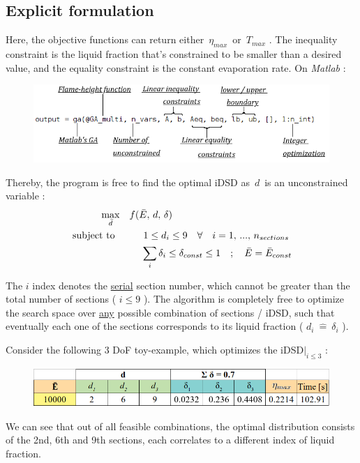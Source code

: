 \documentclass[12pt]{article}
\numberwithin{equation}{section}
\begin{document}
\begin{flushleft}
\subsection{Explicit formulation}
Here, the objective functions can return either \,$\eta_{max}$\, or \,$T_{max}$ . The inequality constraint is the liquid fraction that's constrained to be smaller than a desired value, and the equality constraint is the constant evaporation rate. On \textit{Matlab} : %
\begin{figure}[H] 
\centering
\includegraphics[width=0.875 \linewidth, center]{Matlab_func_a.png}
\end{figure}
Thereby, the program is free to find the optimal iDSD as \,$d$\, is an unconstrained variable :
\begin{align*}
& \hspace{11mm} \underset{ \bar{d} }{\operatorname{max}} & f( \bar{E}, \, d, \, \delta ) \hspace{43mm} \\
&\operatorname{subject \ to}
& 1 \leq d_i \leq 9  \quad \forall \quad i = 1, \, ..., \, n_{sections}  \hspace{1mm} \\
&& \sum_i \delta_i \leq \delta_{const} \leq 1 \quad ; \quad \bar{E} = \bar{E}_{const}
\end{align*}

The $i$ index denotes the \underline{serial} section number, which cannot be greater than the total number of sections ( $i \leq 9$ ). The algorithm is completely free to optimize the search space over \underline{any} possible combination of sections / iDSD, such that eventually each one of the sections corresponds to its liquid fraction ( $ d_i \ \widehat{=} \ \delta_i$ ). 

Consider the following 3 DoF toy-example, which optimizes the iDSD$\big|_{i \leq 3}$  : 
\begin{figure}[H] 
\centering
\includegraphics[width=0.75 \linewidth, center]{Table_example.png}
\end{figure}
We can see that out of all feasible combinations, the optimal distribution consists of the 2nd, 6th and 9th sections, each correlates to a different index of liquid fraction. 


\end{flushleft}
\end{document}
